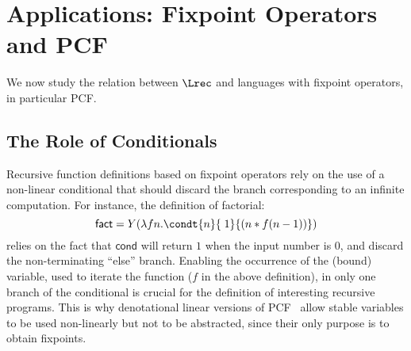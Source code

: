 \documentclass{article}
\begin{document}
\section{Applications:  Fixpoint Operators and PCF}
\label{sec:PCF}


We now study the relation between $\Lrec$ and languages with 
fixpoint operators, in particular PCF.


\subsection{The Role of Conditionals}

Recursive function definitions based on fixpoint operators
rely on the use of a non-linear conditional that should
discard the branch corresponding to an infinite computation.  For
instance, the definition of factorial:
\[
\mathsf{fact} = Y(\lambda fn.\condt{n}{\;1}{(n*f(n-1))})
\]
relies on the fact that $\mathsf{cond}$ will return $1$ when the input
number is $0$, and discard the non-terminating ``else'' branch.
Enabling the occurrence of the (bound) variable, used to iterate the
function ($f$ in the above definition), in only one branch of the
conditional is crucial for the definition of interesting recursive
programs. This is why denotational linear versions of
PCF~\cite{paolini08ppdp} allow stable variables to be used non-linearly
but not to be abstracted, since their only purpose is to obtain
fixpoints.
\end{document}
